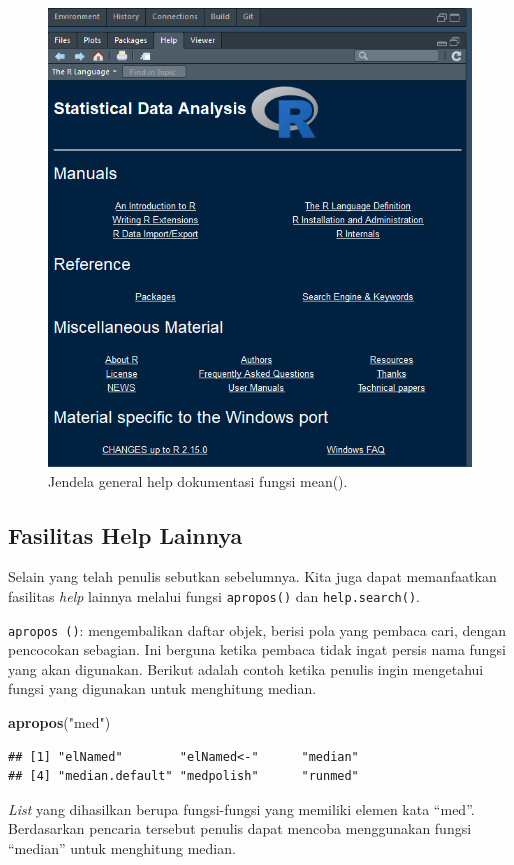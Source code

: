 \documentclass[]{book}
\newenvironment{Shaded}{\begin{snugshade}}{\end{snugshade}}
\newcommand{\KeywordTok}[1]{\textcolor[rgb]{0.13,0.29,0.53}{\textbf{#1}}}
\newcommand{\StringTok}[1]{\textcolor[rgb]{0.31,0.60,0.02}{#1}}
\newcommand{\NormalTok}[1]{#1}
\begin{document}
\begin{figure}

{\centering \includegraphics[width=0.5\linewidth]{generalhelp} 

}

\caption{Jendela general help dokumentasi fungsi mean().}\label{fig:generalhelp}
\end{figure}

\subsection{Fasilitas Help Lainnya}\label{fasilitas-help-lainnya}

Selain yang telah penulis sebutkan sebelumnya. Kita juga dapat
memanfaatkan fasilitas \emph{help} lainnya melalui fungsi
\texttt{apropos()} dan \texttt{help.search()}.

\texttt{apropos\ ()}: mengembalikan daftar objek, berisi pola yang
pembaca cari, dengan pencocokan sebagian. Ini berguna ketika pembaca
tidak ingat persis nama fungsi yang akan digunakan. Berikut adalah
contoh ketika penulis ingin mengetahui fungsi yang digunakan untuk
menghitung median.

\begin{Shaded}
\begin{Highlighting}[]
\KeywordTok{apropos}\NormalTok{(}\StringTok{"med"}\NormalTok{)}
\end{Highlighting}
\end{Shaded}

\begin{verbatim}
## [1] "elNamed"        "elNamed<-"      "median"        
## [4] "median.default" "medpolish"      "runmed"
\end{verbatim}

\emph{List} yang dihasilkan berupa fungsi-fungsi yang memiliki elemen
kata ``med''. Berdasarkan pencaria tersebut penulis dapat mencoba
menggunakan fungsi ``median'' untuk menghitung median.
\end{document}
